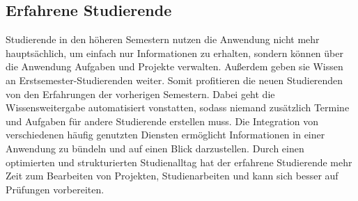 \subsection{Erfahrene Studierende}
Studierende in den höheren Semestern nutzen die Anwendung nicht mehr hauptsächlich, um einfach nur Informationen zu erhalten, sondern können über die Anwendung Aufgaben und Projekte verwalten. Außerdem geben sie Wissen an Erstsemester-Studierenden weiter. Somit profitieren die neuen Studierenden von den Erfahrungen  der vorherigen Semestern. Dabei geht die Wissensweitergabe automatisiert vonstatten, sodass niemand zusätzlich Termine und Aufgaben für andere Studierende erstellen muss. Die Integration von verschiedenen häufig genutzten Diensten ermöglicht Informationen in einer Anwendung zu bündeln und auf einen Blick darzustellen. Durch einen optimierten und strukturierten Studienalltag hat der erfahrene Studierende mehr Zeit zum Bearbeiten von Projekten, Studienarbeiten und kann sich besser auf Prüfungen vorbereiten.